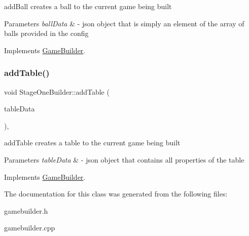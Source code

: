 add\+Ball creates a ball to the current game being built 


\begin{DoxyParams}{Parameters}
{\em ball\+Data} & -\/ json object that is simply an element of the array of balls provided in the config \\
\hline
\end{DoxyParams}


Implements \mbox{\hyperlink{class_game_builder_a836186637bd2f7844f7dfac0135d833b}{Game\+Builder}}.

\mbox{\label{class_stage_one_builder_ac8f35ec11ebe31010410bc50b0149ce9}} 
\subsubsection{\texorpdfstring{add\+Table()}{addTable()}}
{\footnotesize\ttfamily void Stage\+One\+Builder\+::add\+Table (\begin{DoxyParamCaption}\item[{Q\+Json\+Object \&}]{table\+Data }\end{DoxyParamCaption})\hspace{0.3cm}{\ttfamily [override]}, {\ttfamily [virtual]}}



add\+Table creates a table to the current game being built 


\begin{DoxyParams}{Parameters}
{\em table\+Data} & -\/ json object that contains all properties of the table \\
\hline
\end{DoxyParams}


Implements \mbox{\hyperlink{class_game_builder_a65fb629009c18956a8d592352eda1eb5}{Game\+Builder}}.



The documentation for this class was generated from the following files\+:\begin{DoxyCompactItemize}
\item 
gamebuilder.\+h\item 
gamebuilder.\+cpp\end{DoxyCompactItemize}
